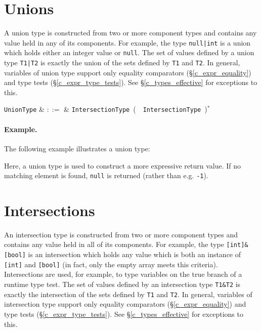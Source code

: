 \section{Unions}
\label{c_types_unions}

A union type is constructed from two or more component types and contains any value held in any of its components.  For example, the type \lstinline{null|int} is a union which holds either an integer value or \lstinline{null}.  The set of values defined by a union type \lstinline{T1|T2} is exactly the union of the sets defined by \lstinline{T1} and \lstinline{T2}.  In general, variables of union type support only equality comparators (\S\ref{c_expr_equality}) and type tests (\S\ref{c_expr_type_tests}).  See \S\ref{c_types_effective} for exceptions to this.

\begin{syntax}
  \verb+UnionType+ & $::=$ & \verb+IntersectionType+\ \big(\ \token{|}\ \verb+IntersectionType+\
  \big)$^*$\\
\end{syntax}

\paragraph{Example.} The following example illustrates a union type:



Here, a union type is used to construct a more expressive return value.  If no matching element is found, \lstinline{null} is returned (rather than e.g. \lstinline{-1}).


\section{Intersections}
\label{c_types_intersections}

An intersection type is constructed from two or more component types and contains any value held in all of its components.  For example, the type \lstinline{[int]&[bool]} is an intersection which holds any value which is both an instance of \lstinline{[int]} and \lstinline{[bool]} (in fact, only the empty array meets this criteria).  Intersections are used, for example, to type variables on the true branch of a runtime type test.  The set of values defined by an intersection type \lstinline{T1&T2} is exactly the intersection of the sets defined by \lstinline{T1} and \lstinline{T2}.  In general, variables of intersection type support only equality comparators (\S\ref{c_expr_equality}) and type tests (\S\ref{c_expr_type_tests}). See \S\ref{c_types_effective} for exceptions to this.

